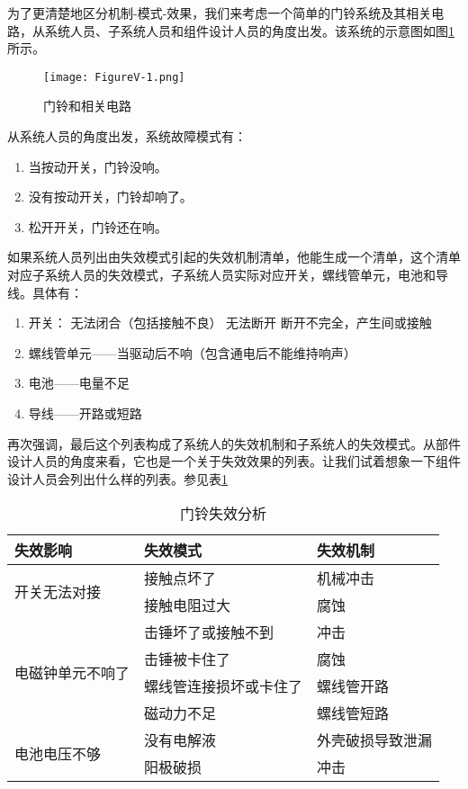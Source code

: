 \documentclass[cn,11pt,chinese]{elegantbook}
\begin{document}
为了更清楚地区分机制-模式-效果，我们来考虑一个简单的门铃系统及其相关电路，从系统人员、子系统人员和组件设计人员的角度出发。该系统的示意图如图\ref{fig:fig5_1} 所示。

\begin{figure}[h]
	\centering
	\texttt{[image: FigureV-1.png]}
	\caption{门铃和相关电路}\label{fig:fig5_1}
\end{figure}

从系统人员的角度出发，系统故障模式有：

\begin{enumerate}
	\item 当按动开关，门铃没响。
	\item 没有按动开关，门铃却响了。
	\item 松开开关，门铃还在响。
\end{enumerate}

如果系统人员列出由失效模式引起的失效机制清单，他能生成一个清单，这个清单对应子系统人员的失效模式，子系统人员实际对应开关，螺线管单元，电池和导线。具体有：


\begin{enumerate}
	\item 开关：
		\subitem 无法闭合（包括接触不良）
		\subitem 无法断开
		\subitem 断开不完全，产生间或接触
	\item 螺线管单元——当驱动后不响（包含通电后不能维持响声）
	\item 电池——电量不足
	\item 导线——开路或短路
\end{enumerate}


再次强调，最后这个列表构成了系统人的失效机制和子系统人的失效模式。从部件设计人员的角度来看，它也是一个关于失效效果的列表。让我们试着想象一下组件设计人员会列出什么样的列表。参见表\ref{tab:tab4_3}

\begin{table}[htpb]
	\centering
	\caption{门铃失效分析}
	\label{tab:tab4_3}
	\begin{tabular}{@{}lll@{}}
		\toprule
		失效影响                      & 失效模式        & 失效机制     \\ \midrule
		\multirow{2}{*}{开关无法对接}   & 接触点坏了       & 机械冲击     \\
		& 接触电阻过大      & 腐蚀       \\ \hline
		\multirow{4}{*}{电磁钟单元不响了} & 击锤坏了或接触不到   & 冲击       \\
		& 击锤被卡住了      & 腐蚀       \\
		& 螺线管连接损坏或卡住了 & 螺线管开路    \\
		& 磁动力不足       & 螺线管短路    \\ \hline
		\multirow{2}{*}{电池电压不够}   & 没有电解液       & 外壳破损导致泄漏 \\
		& 阳极破损        & 冲击       \\ \bottomrule
	\end{tabular}
\end{table}
\end{document}

